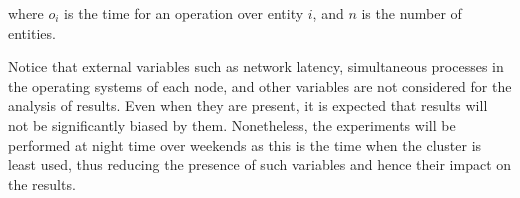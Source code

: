 \noindent where $o_i$ is the time for an operation over entity $i$, and  $n$ is
the number of entities.


Notice that external variables such as network latency,  simultaneous processes
in the operating systems of each node,  and other variables are not considered
for the analysis of results.  Even when they are present,  it is expected that
results will not be significantly biased by them.  Nonetheless,  the
experiments will be  performed at night time over weekends as this is the time
 when the cluster is least used,  thus reducing the presence of such variables
and hence their impact on the results. 





  








